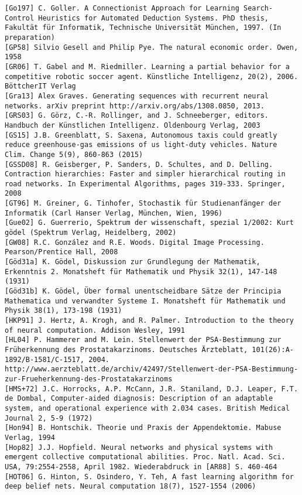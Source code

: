 \documentclass[10pt]{article}
\begin{document}
\begin{verbatim}
[Go197] C. Goller. A Connectionist Approach for Learning Search-Control Heuristics for Automated Deduction Systems. PhD thesis, Fakultät für Informatik, Technische Universität München, 1997. (In preparation)
[GP58] Silvio Gesell and Philip Pye. The natural economic order. Owen, 1958
[GR06] T. Gabel and M. Riedmiller. Learning a partial behavior for a competitive robotic soccer agent. Künstliche Intelligenz, 20(2), 2006. BöttcherIT Verlag
[Gra13] Alex Graves. Generating sequences with recurrent neural networks. arXiv preprint http://arxiv.org/abs/1308.0850, 2013.
[GRS03] G. Görz, C.-R. Rollinger, and J. Schneeberger, editors. Handbuch der Künstlichen Intelligenz. Oldenbourg Verlag, 2003
[GS15] J.B. Greenblatt, S. Saxena, Autonomous taxis could greatly reduce greenhouse-gas emissions of us light-duty vehicles. Nature Clim. Change 5(9), 860-863 (2015)
[GSSD08] R. Geisberger, P. Sanders, D. Schultes, and D. Delling. Contraction hierarchies: Faster and simpler hierarchical routing in road networks. In Experimental Algorithms, pages 319-333. Springer, 2008
[GT96] M. Greiner, G. Tinhofer, Stochastik für Studienanfänger der Informatik (Carl Hanser Verlag, München, Wien, 1996)
[Gue02] G. Guerrerio, Spektrum der wissenschaft, spezial 1/2002: Kurt gödel (Spektrum Verlag, Heidelberg, 2002)
[GW08] R.C. González and R.E. Woods. Digital Image Processing. Pearson/Prentice Hall, 2008
[Göd31a] K. Gödel, Diskussion zur Grundlegung der Mathematik, Erkenntnis 2. Monatsheft für Mathematik und Physik 32(1), 147-148 (1931)
[Göd31b] K. Gödel, Über formal unentscheidbare Sätze der Principia Mathematica und verwandter Systeme I. Monatsheft für Mathematik und Physik 38(1), 173-198 (1931)
[HKP91] J. Hertz, A. Krogh, and R. Palmer. Introduction to the theory of neural computation. Addison Wesley, 1991
[HL04] P. Hammerer and M. Lein. Stellenwert der PSA-Bestimmung zur Früherkennung des Prostatakarzinoms. Deutsches Ärzteblatt, 101(26):A-1892/B-1581/C-1517, 2004. http://www.aerzteblatt.de/archiv/42497/Stellenwert-der-PSA-Bestimmung-zur-Frueherkennung-des-Prostatakarzinoms
[HMS+72] J.C. Horrocks, A.P. McCann, J.R. Staniland, D.J. Leaper, F.T. de Dombal, Computer-aided diagnosis: Description of an adaptable system, and operational experience with 2.034 cases. British Medical Journal 2, 5-9 (1972)
[Hon94] B. Hontschik. Theorie und Praxis der Appendektomie. Mabuse Verlag, 1994
[Hop82] J.J. Hopfield. Neural networks and physical systems with emergent collective computational abilities. Proc. Natl. Acad. Sci. USA, 79:2554-2558, April 1982. Wiederabdruck in [AR88] S. 460-464
[HOT06] G. Hinton, S. Osindero, Y. Teh, A fast learning algorithm for deep belief nets. Neural computation 18(7), 1527-1554 (2006)

\end{verbatim}
\end{document}

